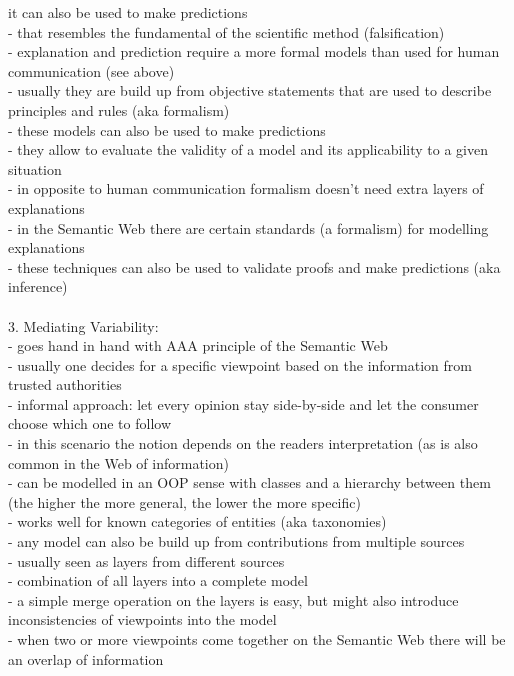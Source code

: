 it can also be used to make predictions \\
- that resembles the fundamental of the scientific method (falsification) \\
- explanation and prediction require a more formal models than used for human communication (see above) \\
- usually they are build up from objective statements that are used to describe principles and rules (aka formalism) \\
- these models can also be used to make predictions \\
- they allow to evaluate the validity of a model and its applicability to a given situation \\
- in opposite to human communication formalism doesn't need extra layers of explanations \\
- in the Semantic Web there are certain standards (a formalism) for modelling explanations \\
- these techniques can also be used to validate proofs and make predictions (aka inference) \\
\\
3. Mediating Variability: \\
- goes hand in hand with AAA principle of the Semantic Web \\
- usually one decides for a specific viewpoint based on the information from trusted authorities \\
- informal approach: let every opinion stay side-by-side and let the consumer choose which one to follow \\
- in this scenario the notion depends on the readers interpretation (as is also common in the Web of information) \\
- can be modelled in an OOP sense with classes and a hierarchy between them (the higher the more general, the lower the more specific) \\
- works well for known categories of entities (aka taxonomies) \\
- any model can also be build up from contributions from multiple sources \\
- usually seen as layers from different sources \\
- combination of all layers into a complete model \\
- a simple merge operation on the layers is easy, but might also introduce inconsistencies of viewpoints into the model \\
- when two or more viewpoints come together on the Semantic Web there will be an overlap of information \\
